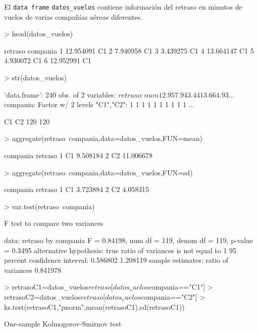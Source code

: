 \documentclass[10pt]{article}
\newcounter{problemes}
\newcounter{punts} \def\thepunts{\arabic{punts}}
\def\probl{\addtocounter{problemes}{1} \setcounter{punts}{0}
\medskip\noindent{\bf \theproblemes) }}
\begin{document}
\probl El \verb+data frame+ \verb+datos_vuelos+ contiene información del retraso en minutos de vuelos de varias compañías aéreas diferentes.



\begin{Schunk}
\begin{Sinput}
> head(datos_vuelos)
\end{Sinput}
\begin{Soutput}
    retraso compania
1 12.954091       C1
2  7.940958       C1
3  3.439275       C1
4 13.664147       C1
5  4.930072       C1
6 12.952991       C1
\end{Soutput}
\begin{Sinput}
> str(datos_vuelos)
\end{Sinput}
\begin{Soutput}
'data.frame':	240 obs. of  2 variables:
 $ retraso : num  12.95 7.94 3.44 13.66 4.93 ...
 $ compania: Factor w/ 2 levels "C1","C2": 1 1 1 1 1 1 1 1 1 1 ...
\end{Soutput}
\begin{Soutput}
 C1  C2 
120 120 
\end{Soutput}
\begin{Sinput}
> aggregate(retraso~compania,data=datos_vuelos,FUN=mean)
\end{Sinput}
\begin{Soutput}
  compania   retraso
1       C1  9.508184
2       C2 11.006678
\end{Soutput}
\begin{Sinput}
> aggregate(retraso~compania,data=datos_vuelos,FUN=sd) 
\end{Sinput}
\begin{Soutput}
  compania  retraso
1       C1 3.723884
2       C2 4.058315
\end{Soutput}
\begin{Sinput}
> var.test(retraso~compania)
\end{Sinput}
\begin{Soutput}
	F test to compare two variances

data:  retraso by compania
F = 0.84198, num df = 119, denom df = 119, p-value = 0.3495
alternative hypothesis: true ratio of variances is not equal to 1
95 percent confidence interval:
 0.586802 1.208119
sample estimates:
ratio of variances 
          0.841978 
\end{Soutput}
\begin{Sinput}
> retrasoC1=datos_vuelos$retraso[datos_vuelos$compania=="C1"]
> retrasoC2=datos_vuelos$retraso[datos_vuelos$compania=="C2"]
> ks.test(retrasoC1,"pnorm",mean(retrasoC1),sd(retrasoC1))
\end{Sinput}
\begin{Soutput}
	One-sample Kolmogorov-Smirnov test


\end{Soutput}
\end{Schunk}
\end{document}
